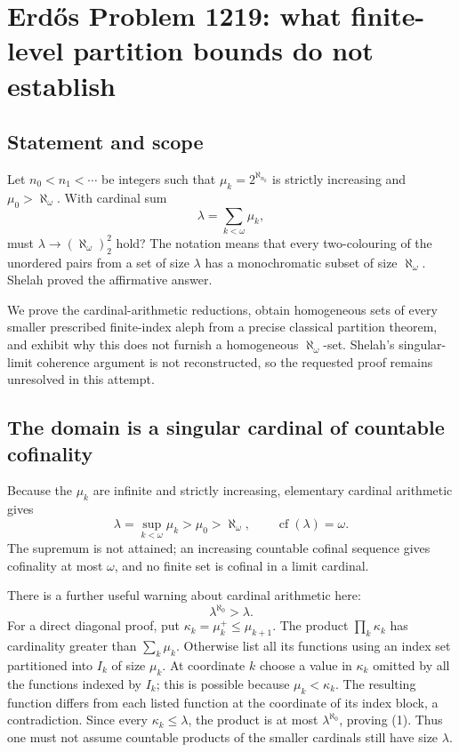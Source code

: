 \section*{Erd\H{o}s Problem 1219: what finite-level partition bounds do not establish}
\subsection*{Statement and scope}
Let $n_0<n_1<\cdots$ be integers such that
$\mu_k=2^{\aleph_{n_k}}$ is strictly increasing and $\mu_0>\aleph_\omega$. With cardinal sum
\[
 \lambda=\sum_{k<\omega}\mu_k,
\]
must $\lambda\to(\aleph_\omega)^2_2$ hold? The notation means that every two-colouring of the unordered pairs from a set of size $\lambda$ has a monochromatic subset of size $\aleph_\omega$. Shelah proved the affirmative answer.

We prove the cardinal-arithmetic reductions, obtain homogeneous sets of every smaller prescribed finite-index aleph from a precise classical partition theorem, and exhibit why this does not furnish a homogeneous $\aleph_\omega$-set. Shelah's singular-limit coherence argument is not reconstructed, so the requested proof remains unresolved in this attempt.

\subsection*{The domain is a singular cardinal of countable cofinality}
Because the $\mu_k$ are infinite and strictly increasing, elementary cardinal arithmetic gives
\[
 \lambda=\sup_{k<\omega}\mu_k>\mu_0>\aleph_\omega,
 \qquad\operatorname{cf}(\lambda)=\omega.
\]
The supremum is not attained; an increasing countable cofinal sequence gives cofinality at most $\omega$, and no finite set is cofinal in a limit cardinal.

There is a further useful warning about cardinal arithmetic here:
\[
 \lambda^{\aleph_0}>\lambda.
 \tag{1}
\]
For a direct diagonal proof, put $\kappa_k=\mu_k^+\le\mu_{k+1}$. The product $\prod_k\kappa_k$ has cardinality greater than $\sum_k\mu_k$. Otherwise list all its functions using an index set partitioned into $I_k$ of size $\mu_k$. At coordinate $k$ choose a value in $\kappa_k$ omitted by all the functions indexed by $I_k$; this is possible because $\mu_k<\kappa_k$. The resulting function differs from each listed function at the coordinate of its index block, a contradiction. Since every $\kappa_k\le\lambda$, the product is at most $\lambda^{\aleph_0}$, proving (1). Thus one must not assume countable products of the smaller cardinals still have size $\lambda$.

